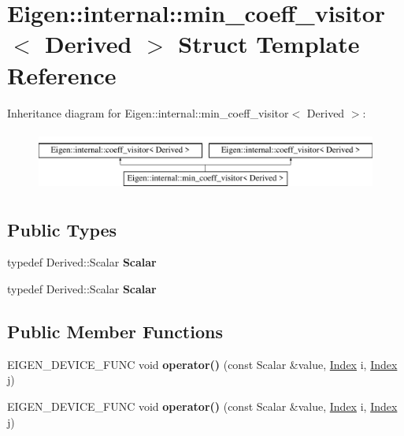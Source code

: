 \hypertarget{struct_eigen_1_1internal_1_1min__coeff__visitor}{}\section{Eigen\+:\+:internal\+:\+:min\+\_\+coeff\+\_\+visitor$<$ Derived $>$ Struct Template Reference}
\label{struct_eigen_1_1internal_1_1min__coeff__visitor}
Inheritance diagram for Eigen\+:\+:internal\+:\+:min\+\_\+coeff\+\_\+visitor$<$ Derived $>$\+:\begin{figure}[H]
\begin{center}
\leavevmode
\includegraphics[height=2.000000cm]{struct_eigen_1_1internal_1_1min__coeff__visitor}
\end{center}
\end{figure}
\subsection*{Public Types}
\begin{DoxyCompactItemize}
\item 
\mbox{\label{struct_eigen_1_1internal_1_1min__coeff__visitor_a03daf8994ba68bd00977f86ba0c6ecfd}} 
typedef Derived\+::\+Scalar {\bfseries Scalar}
\item 
\mbox{\label{struct_eigen_1_1internal_1_1min__coeff__visitor_a03daf8994ba68bd00977f86ba0c6ecfd}} 
typedef Derived\+::\+Scalar {\bfseries Scalar}
\end{DoxyCompactItemize}
\subsection*{Public Member Functions}
\begin{DoxyCompactItemize}
\item 
\mbox{\label{struct_eigen_1_1internal_1_1min__coeff__visitor_a5bbabda415cc8cabce947bf31f9456a4}} 
E\+I\+G\+E\+N\+\_\+\+D\+E\+V\+I\+C\+E\+\_\+\+F\+U\+NC void {\bfseries operator()} (const Scalar \&value, \hyperlink{namespace_eigen_a62e77e0933482dafde8fe197d9a2cfde}{Index} i, \hyperlink{namespace_eigen_a62e77e0933482dafde8fe197d9a2cfde}{Index} j)
\item 
\mbox{\label{struct_eigen_1_1internal_1_1min__coeff__visitor_a5bbabda415cc8cabce947bf31f9456a4}} 
E\+I\+G\+E\+N\+\_\+\+D\+E\+V\+I\+C\+E\+\_\+\+F\+U\+NC void {\bfseries operator()} (const Scalar \&value, \hyperlink{namespace_eigen_a62e77e0933482dafde8fe197d9a2cfde}{Index} i, \hyperlink{namespace_eigen_a62e77e0933482dafde8fe197d9a2cfde}{Index} j)
\end{DoxyCompactItemize}
